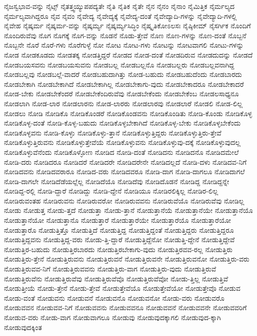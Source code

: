 {ನೈಜಸ್ವಭಾವ-ವನ್ನು
ನೈಟ್ಸ್
ನೈತತ್ತ್ವಯ್ಯುಪಪದ್ಯತೇ
ನೈತಿ
ನೈತಿಕ
ನೈತೇ
ನೈನ
ನೈನಂ
ನೈನಾಂ
ನೈಮಿತ್ತಿಕ
ನೈರ್ಮಲ್ಯದ
ನೈರ್ಮಲ್ಯವಾಗಿದ್ದರೂ
ನೈವ
ನೈವಂ
ನೈವೇದ್ಯ
ನೈವೇದ್ಯಕ್ಕೆ
ನೈವೇದ್ಯ-ದಂತೆ
ನೈವೇದ್ಯಾದಿ-ಗಳನ್ನು
ನೈವೇದ್ಯಾದಿ-ಗಳಲ್ಲಿ
ನೈವೇಹ
ನೈಷ್ಕರ್ಮ
ನೈಷ್ಕರ್ಮ-ವನ್ನು
ನೈಷ್ಕರ್ಮ್ಯ
ನೈಷ್ಕರ್ಮ್ಯಸಿದ್ಧಿಂ
ನೈಷ್ಕೃತಿಕೋಽಲಸಃ
ನೈಷ್ಠಿಕೀಮ್
ನೈಸರ್ಗಿಕ
ನೊಂದಿಗೆ
ನೊಂದಿರುವೆವು
ನೊಗ
ನೊಗಕ್ಕೆ
ನೊಗ-ವನ್ನು
ನೊಡನೆ
ನೊಡು-ತ್ತೇವೆ
ನೊಣ
ನೊಣ-ಗಳನ್ನು
ನೊಣ-ದಂತೆ
ನೊಬ್ಬನೆ
ನೊಬ್ಬನೇ
ನೊರೆ
ನೊರೆ-ಗಳು
ನೊರೆಗುಳ್ಳೆ
ನೋ
ನೋಟ
ನೋಟ-ಗಳು
ನೋಟನ್ನು
ನೋಟವಾಗಲಿ
ನೋಟು-ಗಳನ್ನು
ನೋಡ
ನೋಡಕೂಡದು
ನೋಡತಕ್ಕ
ನೋಡತ್ತಿದ್ದರೆ
ನೋಡದ
ನೋಡ-ದಂತೆ
ನೋಡದಿರುವ
ನೋಡದುದನ್ನು
ನೋಡದೆ
ನೋಡಬಯಸವನು
ನೋಡಬಯಸುವನು
ನೋಡಬಲ್ಲ
ನೋಡಬಲ್ಲನೊ
ನೋಡಬಲ್ಲರು
ನೋಡಬಲ್ಲವನಾಗಿದ್ದ
ನೋಡಬಲ್ಲವು
ನೋಡಬಲ್ಲೆ-ವಾದರೆ
ನೋಡಬಹುದಾಗಿತ್ತು
ನೋಡ-ಬಹುದು
ನೋಡಬಹುದೆಂದು
ನೋಡಬಾರದು
ನೋಡಬೇಕಾಗಿ
ನೋಡಬೇಕಾಗಿದೆ
ನೋಡಬೇಕಾಗಿಲ್ಲ
ನೋಡಬೇಕಾಗು-ವುದು
ನೋಡಬೇಕಾದರೂ
ನೋಡಬೇಕಾದರೆ
ನೋಡ-ಬೇಕು
ನೋಡಬೇಕೆಂದರೆ
ನೋಡಬೇಕೆಂದಿರುವೆವು
ನೋಡಬೇಕೆಂದು
ನೋಡಬೇಕೆಂಬ
ನೋಡಲಸಾಧ್ಯನೂ
ನೋಡಲಾಗಿ
ನೋಡ-ಲಾರ
ನೋಡಲಾರನು
ನೋಡ-ಲಾರರು
ನೋಡಲಾರವು
ನೋಡಲಾರೆ
ನೋಡಲಿ
ನೋಡ-ಲಿಲ್ಲ
ನೋಡಲು
ನೋಡಿ
ನೋಡಿಕೊ
ನೋಡಿಕೊಂಡರೆ
ನೋಡಿಕೊಂಡವನು
ನೋಡಿಕೊಂಡಿತು
ನೋಡಿ-ಕೊಂಡು
ನೋಡಿಕೊಳ್ಳ
ನೋಡಿಕೊಳ್ಳ-ದಂತೆ
ನೋಡಿ-ಕೊಳ್ಳ-ಬಹುದು
ನೋಡಿಕೊಳ್ಳಬೇಕಾಗಿದೆ
ನೋಡಿಕೊಳ್ಳ-ಬೇಕು
ನೋಡಿಕೊಳ್ಳಬೇಕೆಂದು
ನೋಡಿಕೊಳ್ಳವನು
ನೋಡಿ-ಕೊಳ್ಳು
ನೋಡಿಕೊಳ್ಳು-ತ್ತಾನೆ
ನೋಡಿಕೊಳ್ಳುತ್ತಿದ್ದರು
ನೋಡಿಕೊಳ್ಳುತ್ತಿರು-ತ್ತೇವೆ
ನೋಡಿಕೊಳ್ಳುತ್ತಿರುವನು
ನೋಡಿಕೊಳ್ಳುತ್ತೇವೆಯೆ
ನೋಡಿಕೊಳ್ಳುವನು
ನೋಡಿಕೊಳ್ಳುವು-ದಕ್ಕೆ
ನೋಡಿಕೊಳ್ಳುವುದಲ್ಲ
ನೋಡಿಕೊಳ್ಳುವೆನೆಂದು
ನೋಡಿಕೊಳ್ಳೋಣ
ನೋಡಿದ
ನೋಡಿ-ದಂತೆ
ನೋಡಿದನು
ನೋಡಿದನೊ
ನೋಡಿದಮೇಲೆ
ನೋಡಿ-ದರು
ನೋಡಿದರೂ
ನೋಡಿದರೆ
ನೋಡಿದರೇ
ನೋಡಿದರೇನೇ
ನೋಡಿದಲ್ಲದೆ
ನೋಡಿ-ದಳು
ನೋಡಿದವ-ನಿಗೆ
ನೋಡಿದವನು
ನೋಡಿದವರಾರೂ
ನೋಡಿದ-ವರು
ನೋಡಿದವರೂ
ನೋಡಿ-ದಾಗ
ನೋಡಿ-ದಾಗಲೂ
ನೋಡಿದಾಗಲೆ
ನೋಡಿ-ದಾಗಲೇ
ನೋಡಿದೆಡೆಯಲ್ಲೆಲ್ಲ
ನೋಡಿದೆಯೊ
ನೋಡಿದೆವು
ನೋಡಿದೊಡನೆ
ನೋಡಿದ್ದ
ನೋಡಿದ್ದನ್ನೇ
ನೋಡಿದ್ದ-ರಲ್ಲಿ
ನೋಡಿ-ದ್ದಾರೆ
ನೋಡಿದ್ದು
ನೋಡಿ-ದ್ದೇನೆ
ನೋಡಿಯೂ
ನೋಡಿರಲಿಕ್ಕಿಲ್ಲ
ನೋಡಿರ-ಲಿಲ್ಲ
ನೋಡಿರುವಂತಹ
ನೋಡಿರುವನು
ನೋಡಿರುವರೋ
ನೋಡಿರುವವನು
ನೋಡಿರುವೆಯೊ
ನೋಡಿರುವೆವು
ನೋಡಿಲ್ಲ
ನೋಡು
ನೋಡುತ್ತ
ನೋಡು-ತ್ತದೆ
ನೋಡುತ್ತಾ
ನೋಡು-ತ್ತಾನೆ
ನೋಡುತ್ತಾನೆಯೆ
ನೋಡುತ್ತಾನೆಯೇ
ನೋಡುತ್ತಾನೆಯೊ
ನೋಡುತ್ತಾನೆಯೋ
ನೋಡುತ್ತಾನೊ
ನೋಡುತ್ತಾರೆ
ನೋಡುತ್ತಾರೆಯೇ
ನೋಡುತ್ತಾರೆಯೊ
ನೋಡುತ್ತಾರೆಯೋ
ನೋಡುತ್ತಾರೊ
ನೋಡುತ್ತಿತ್ತೊ
ನೋಡುತ್ತಿದೆ
ನೋಡುತ್ತಿದ್ದ
ನೋಡುತ್ತಿದ್ದಂತೆ
ನೋಡುತ್ತಿದ್ದರು
ನೋಡುತ್ತಿದ್ದರೂ
ನೋಡುತ್ತಿದ್ದವನು
ನೋಡುತ್ತಿದ್ದ-ವರು
ನೋಡು-ತ್ತಿ-ದ್ದಾರೆ
ನೋಡುತ್ತಿದ್ದೆನೋ
ನೋಡುತ್ತಿ-ದ್ದೇನೆ
ನೋಡುತ್ತಿದ್ದೇವೆ
ನೋಡುತ್ತಿರ-ಬಹುದು
ನೋಡುತ್ತಿರಬಾರದು
ನೋಡುತ್ತಿರಬೇಕಾಗು-ವುದು
ನೋಡುತ್ತಿರವವ-ರಲ್ಲ
ನೋಡುತ್ತಿರು
ನೋಡುತ್ತಿರು-ತ್ತೇನೆ
ನೋಡುತ್ತಿರುವನು
ನೋಡುತ್ತಿರುವನೆ
ನೋಡುತ್ತಿರುವನೇ
ನೋಡುತ್ತಿರುವನೋ
ನೋಡುತ್ತಿರು-ವರು
ನೋಡುತ್ತಿರುವವ-ನಿಗೆ
ನೋಡುತ್ತಿರುವವನು
ನೋಡುತ್ತಿರು-ವಾಗ
ನೋಡುತ್ತಿರು-ವುದು
ನೋಡುತ್ತಿರುವೆ
ನೋಡುತ್ತಿರುವೆನು
ನೋಡುತ್ತಿರುವೆವು
ನೋಡುತ್ತಿರುವೆವೊ
ನೋಡುತ್ತಿರುವೆವೋ
ನೋಡು-ತ್ತಿಲ್ಲ
ನೋಡುತ್ತಿವೆ
ನೋಡುತ್ತೀಯೆ
ನೋಡು-ತ್ತೇನೆ
ನೋಡು-ತ್ತೇವೆ
ನೋಡುತ್ತೇವೆಯೊ
ನೋಡುತ್ತೇವೆಯೋ
ನೋಡುತ್ತೇವೊ
ನೋಡುವ
ನೋಡು-ವಂತೆ
ನೋಡುವನು
ನೋಡುವನೆ
ನೋಡುವನೊ
ನೋಡುವನೋ
ನೋಡು-ವರು
ನೋಡುವರೊ
ನೋಡುವವನ
ನೋಡುವವ-ನಿಗೆ
ನೋಡುವವನು
ನೋಡುವವನೂ
ನೋಡುವವನೆ
ನೋಡುವವನೇ
ನೋಡುವವರಿಗೆ
ನೋಡುವ-ವರು
ನೋಡು-ವಾಗ
ನೋಡುವಾಗಲೂ
ನೋಡುವು
ನೋಡುವುದಕ್ಕಾಗಲಿ
ನೋಡುವುದ-ಕ್ಕಾಗಿ
ನೋಡುವುದಕ್ಕಿಂತ
}

